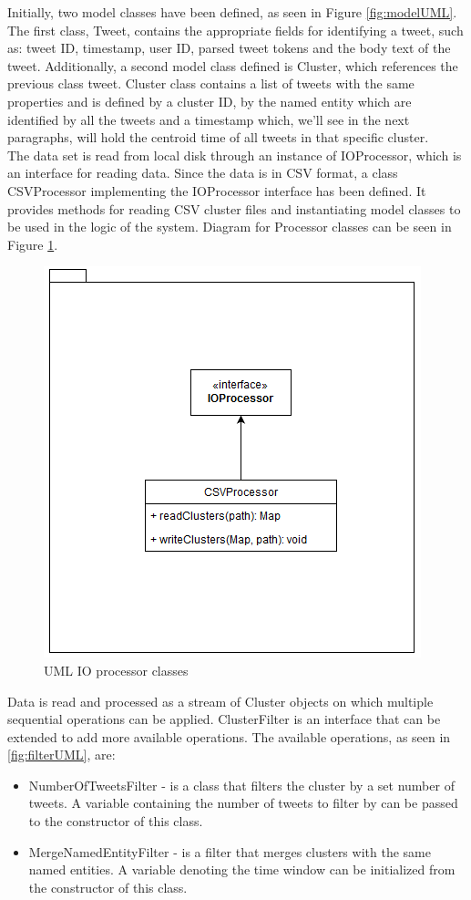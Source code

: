 \documentclass[a4paper,portrait,12pt]{article}
\begin{document}
Initially, two model classes have been defined, as seen in Figure \ref{fig:modelUML}.
The first class, Tweet, contains the appropriate fields for identifying a tweet, such as: tweet ID, timestamp, user ID, parsed tweet tokens and the body text of the tweet.
Additionally, a second model class defined is Cluster, which references the previous class tweet. Cluster class contains a list of tweets with the same properties and is defined by a cluster ID, by the named entity which are identified by all the tweets and a timestamp which, we'll see in the next paragraphs, will hold the centroid time of all tweets in that specific cluster.\\

The data set is read from local disk through an instance of IOProcessor, which is an interface for reading data.
Since the data is in CSV format, a class CSVProcessor implementing the IOProcessor interface has been defined.
It provides methods for reading CSV cluster files and instantiating model classes to be used in the logic of the system.
Diagram for Processor classes can be seen in Figure \ref{fig:processorUML}. \\

\begin{figure}[h!]
	\centering
	\includegraphics[width=0.5\linewidth]{images/processorUML.png}
	\caption{UML IO processor classes}
	\label{fig:processorUML}
\end{figure}

Data is read and processed as a stream of Cluster objects on which multiple sequential operations can be applied.
ClusterFilter is an interface that can be extended to add more available operations.
The available operations, as seen in \ref{fig:filterUML}, are:
\begin{itemize}
	\item NumberOfTweetsFilter - is a class that filters the cluster by a set number of tweets.
	      A variable containing the number of tweets to filter by can be passed to the constructor of this class.
	\item MergeNamedEntityFilter - is a filter that merges clusters with the same named entities.
	      A variable denoting the time window can be initialized from the constructor of this class.
\end{itemize}
\end{document}
